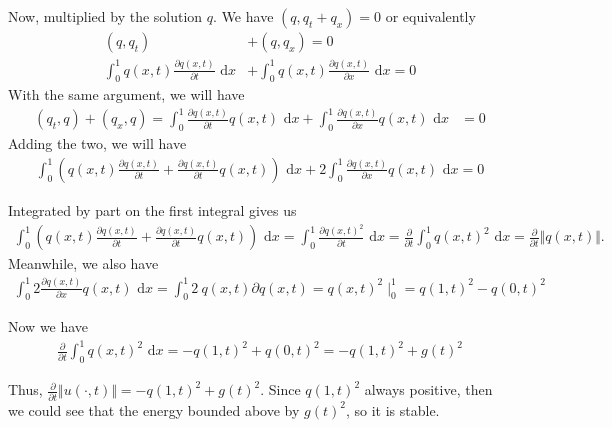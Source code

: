 \documentclass{article}
\theoremstyle{definition}
\begin{document}
    Now, multiplied by the solution $q$. We have $(q,q_t + q_x) = 0$ or equivalently
    \begin{align}
        (q,q_t) &+ (q,q_x) = 0 \\
        \int_0^1 q(x,t)\frac{\partial q(x,t)}{\partial t} \text{ d}x &+ 
        \int_0^1 q(x,t)\frac{\partial q(x,t)}{\partial x} \text{ d}x = 0
    \end{align}
    With the same argument, we will have
    \begin{align}
        (q_t,q) + (q_x,q) = 
        \int_0^1 \frac{\partial q(x,t)}{\partial t} q(x,t)\text{ d}x+ 
        \int_0^1 \frac{\partial q(x,t)}{\partial x} q(x,t) \text{ d}x &= 0
    \end{align}
    Adding the two, we will have 
    \begin{align}    
        \int_0^1 \left(q(x,t)\frac{\partial q(x,t)}{\partial t} + 
        \frac{\partial q(x,t)}{\partial t} q(x,t) \right) \text{ d}x 
        + 2\int_0^1 \frac{\partial q(x,t)}{\partial x} q(x,t) \text{ d}x = 0
    \end{align}
    

    Integrated by part on the first integral gives us 
    \begin{align}
        \int_0^1 \left(q(x,t)\frac{\partial q(x,t)}{\partial t} + 
        \frac{\partial q(x,t)}{\partial t} q(x,t) \right) \text{ d}x  
        = \int_0^1 \frac{\partial q(x,t)^2}{\partial t} \text{ d}x 
        = \frac{\partial}{\partial t} \int_0^1 q(x,t)^2 \text{ d}x 
        = \frac{\partial}{\partial t} \Vert q(x,t)\Vert.  
    \end{align}
    Meanwhile, we also have 
    \begin{align}
        \int_0^1 2\frac{\partial q(x,t)}{\partial x} q(x,t) \text{ d}x 
        = \int_0^1 2\ q(x,t) \partial q(x,t) = q(x,t)^2\mid_0^1 
        = q(1,t)^2 - q(0,t)^2
    \end{align}

    Now we have 
    \begin{align}
        \frac{\partial}{\partial t} \int_0^1 q(x,t)^2 \text{ d}x 
        = - q(1,t)^2 + q(0,t)^2 = - q(1,t)^2 + g(t)^2
    \end{align}

    Thus, $\frac{\partial}{\partial t} \Vert u(\cdot,t) \Vert 
    =   - q(1,t)^2 + g(t)^2$. 
    Since $q(1,t)^2$ always positive, then we could see that 
    the energy bounded above by $g(t)^2$, so it is stable. 
\end{document}
